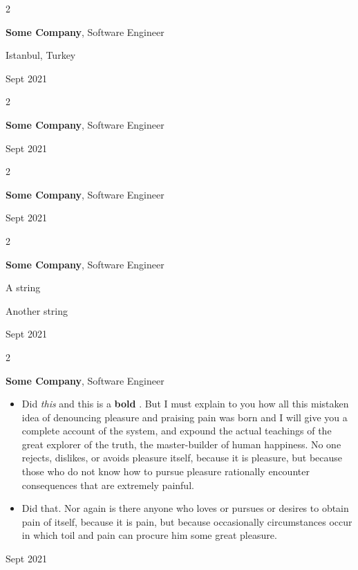\documentclass[10pt, letterpaper]{article}
\newenvironment{summary}{
    \begin{description}[
        topsep=0.10 cm,
        parsep=0.10 cm,
        partopsep=0pt,
        itemsep=0pt,
        leftmargin=0.4 cm + 10pt
    ]
}{
    \end{description}
} %
\newenvironment{highlights}{
    \begin{itemize}[
        topsep=0.10 cm,
        parsep=0.10 cm,
        partopsep=0pt,
        itemsep=0pt,
        leftmargin=0.4 cm + 10pt
    ]
}{
    \end{itemize}
} %
\newenvironment{twocolentry}[2][]{
    \onecolentry
    \def\secondColumn{#2}
    \setcolumnwidth{\fill, 4.5 cm}
    \begin{paracol}{2}
}{
    \switchcolumn \raggedleft \secondColumn
    \end{paracol}
    \endonecolentry
} %
\let\hrefWithoutArrow\href
\renewcommand{\href}[2]{\hrefWithoutArrow{#1}{\ifthenelse{\equal{#2}{}}{ }{#2 }\raisebox{.15ex}{\footnotesize \faExternalLink*}}}
\begin{document}
        \vspace{0.2 cm}

        \begin{twocolentry}{
            Istanbul, Turkey

        Sept 2021
        }
            \textbf{Some \textnormal{Company}}, Software Engineer
        \end{twocolentry}


        \vspace{0.2 cm}

        \begin{twocolentry}{
            Sept 2021
        }
            \textbf{Some \textnormal{Company}}, Software Engineer
        \end{twocolentry}


        \vspace{0.2 cm}

        \begin{twocolentry}{
            Sept 2021
        }
            \textbf{Some \textnormal{Company}}, Software Engineer
        \end{twocolentry}


        \vspace{0.2 cm}

        \begin{twocolentry}{
            Sept 2021
        }
            \textbf{Some \textnormal{Company}}, Software Engineer
            \begin{summary}
                \item A string
                \item Another string
            \end{summary}
        \end{twocolentry}


        \vspace{0.2 cm}

        \begin{twocolentry}{
            Sept 2021
        }
            \textbf{Some \textnormal{Company}}, Software Engineer
            \begin{highlights}
                \item Did \textit{this} and this is a \textbf{bold} \href{https://example.com}{link}. But I must explain to you how all this mistaken idea of denouncing pleasure and praising pain was born and I will give you a complete account of the system, and expound the actual teachings of the great explorer of the truth, the master-builder of human happiness. No one rejects, dislikes, or avoids pleasure itself, because it is pleasure, but because those who do not know how to pursue pleasure rationally encounter consequences that are extremely painful.
                \item Did that. Nor again is there anyone who loves or pursues or desires to obtain pain of itself, because it is pain, but because occasionally circumstances occur in which toil and pain can procure him some great pleasure.
            \end{highlights}
        \end{twocolentry}
\end{document}
